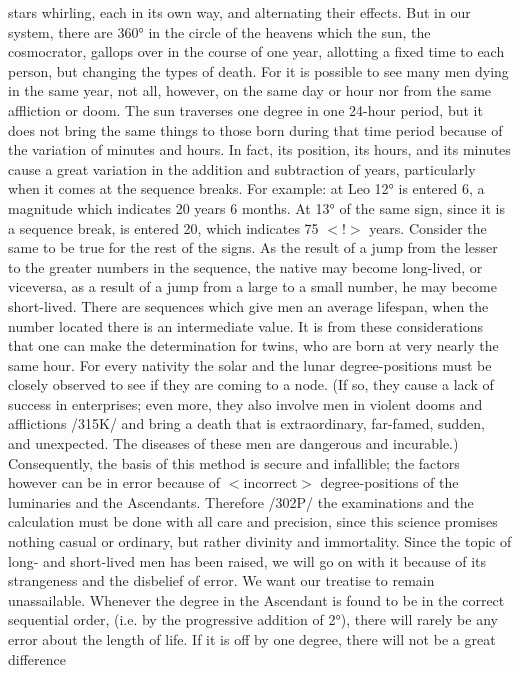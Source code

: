 stars whirling, each in its own way, and alternating their effects. But in our system, there are 360° in the
circle of the heavens which the sun, the cosmocrator, gallops over in the course of one year, allotting a fixed
time to each person, but changing the types of death. For it is possible to see many men dying in the
same year, not all, however, on the same day or hour nor from the same affliction or doom. The sun
traverses one degree in one 24-hour period, but it does not bring the same things to those born during that
time period because of the variation of minutes and hours.
In fact, its position, its hours, and its minutes cause a great variation in the addition and subtraction of
years, particularly when it comes at the sequence breaks. For example: at Leo 12° is entered 6, a magnitude
which indicates 20 years 6 months. At 13° of the same sign, since it is a sequence break, is entered 20,
which indicates 75 $<$!$>$ years. Consider the same to be true for the rest of the signs. As the result of a
jump from the lesser to the greater numbers in the sequence, the native may become long-lived, or viceversa,
as a result of a jump from a large to a small number, he may become short-lived. There are
sequences which give men an average lifespan, when the number located there is an intermediate value. It
is from these considerations that one can make the determination for twins, who are born at very nearly the
same hour.
For every nativity the solar and the lunar degree-positions must be closely observed to see if they are
coming to a node. (If so, they cause a lack of success in enterprises; even more, they also involve men in
violent dooms and afflictions /315K/ and bring a death that is extraordinary, far-famed, sudden, and
unexpected. The diseases of these men are dangerous and incurable.) Consequently, the basis of this
method is secure and infallible; the factors however can be in error because of $<$incorrect$>$ degree-positions of the luminaries and the Ascendants. Therefore /302P/ the examinations and the calculation must be done
with all care and precision, since this science promises nothing casual or ordinary, but rather divinity and
immortality.
Since the topic of long- and short-lived men has been raised, we will go on with it because of its
strangeness and the disbelief of error. We want our treatise to remain unassailable. Whenever the degree in
the Ascendant is found to be in the correct sequential order, (i.e. by the progressive addition of 2°), there
will rarely be any error about the length of life. If it is off by one degree, there will not be a great difference
